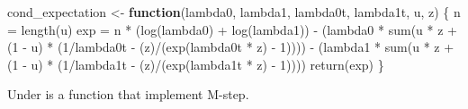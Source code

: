 \documentclass[
]{article}
\newenvironment{Shaded}{\begin{snugshade}}{\end{snugshade}}
\newcommand{\ControlFlowTok}[1]{\textcolor[rgb]{0.13,0.29,0.53}{\textbf{#1}}}
\newcommand{\DecValTok}[1]{\textcolor[rgb]{0.00,0.00,0.81}{#1}}
\newcommand{\FunctionTok}[1]{\textcolor[rgb]{0.00,0.00,0.00}{#1}}
\newcommand{\NormalTok}[1]{#1}
\newcommand{\OtherTok}[1]{\textcolor[rgb]{0.56,0.35,0.01}{#1}}
\newcommand{\SpecialCharTok}[1]{\textcolor[rgb]{0.00,0.00,0.00}{#1}}
\begin{document}
\begin{Shaded}
\begin{Highlighting}[]
\NormalTok{cond\_expectation }\OtherTok{\textless{}{-}} \ControlFlowTok{function}\NormalTok{(lambda0, lambda1, lambda0t, lambda1t, u, z) \{}
\NormalTok{    n }\OtherTok{=} \FunctionTok{length}\NormalTok{(u)}
\NormalTok{    exp }\OtherTok{=}\NormalTok{ n }\SpecialCharTok{*}\NormalTok{ (}\FunctionTok{log}\NormalTok{(lambda0) }\SpecialCharTok{+} \FunctionTok{log}\NormalTok{(lambda1)) }\SpecialCharTok{{-}}\NormalTok{ (lambda0 }\SpecialCharTok{*} \FunctionTok{sum}\NormalTok{(u }\SpecialCharTok{*}\NormalTok{ z }\SpecialCharTok{+}\NormalTok{ (}\DecValTok{1} \SpecialCharTok{{-}}\NormalTok{ u) }\SpecialCharTok{*}\NormalTok{ (}\DecValTok{1}\SpecialCharTok{/}\NormalTok{lambda0t }\SpecialCharTok{{-}}
\NormalTok{        (z)}\SpecialCharTok{/}\NormalTok{(}\FunctionTok{exp}\NormalTok{(lambda0t }\SpecialCharTok{*}\NormalTok{ z) }\SpecialCharTok{{-}} \DecValTok{1}\NormalTok{)))) }\SpecialCharTok{{-}}\NormalTok{ (lambda1 }\SpecialCharTok{*} \FunctionTok{sum}\NormalTok{(u }\SpecialCharTok{*}\NormalTok{ z }\SpecialCharTok{+}\NormalTok{ (}\DecValTok{1} \SpecialCharTok{{-}}\NormalTok{ u) }\SpecialCharTok{*}\NormalTok{ (}\DecValTok{1}\SpecialCharTok{/}\NormalTok{lambda1t }\SpecialCharTok{{-}}
\NormalTok{        (z)}\SpecialCharTok{/}\NormalTok{(}\FunctionTok{exp}\NormalTok{(lambda1t }\SpecialCharTok{*}\NormalTok{ z) }\SpecialCharTok{{-}} \DecValTok{1}\NormalTok{))))}
    \FunctionTok{return}\NormalTok{(exp)}
\NormalTok{\}}
\end{Highlighting}
\end{Shaded}

Under is a function that implement M-step.
\end{document}
